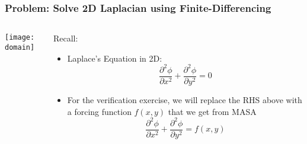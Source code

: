\documentclass[mathserif]{beamer}
\begin{document}
\begin{frame}
  \frametitle{Problem: Solve 2D Laplacian using Finite-Differencing}
  \begin{columns}[c]
    \begin{column}{5cm}

      \texttt{[image: domain]}

    \end{column}
    
    \begin{column}{6.5cm}
      
      \begin{block}{Recall:}
        \begin{itemize} 

          \item Laplace's Equation in 2D:
          \begin{equation}
            \nonumber     
            \frac{\partial^2 \phi}{\partial x^2} + \frac{\partial^2 \phi}{\partial y^2} = 0
          \end{equation}

	  \item For the verification exercise, we will replace the RHS
	    above with a forcing function $f(x,y)$ that we get from
	    MASA
          \begin{equation}
            \nonumber     
            \frac{\partial^2 \phi}{\partial x^2} + \frac{\partial^2
	      \phi}{\partial y^2} = f(x,y)
	    \end{equation}
          


\end{itemize}
\end{block}
\end{column}
\end{columns}
\end{frame}
\end{document}
